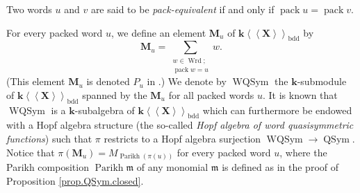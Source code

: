 \documentclass[numbers=enddot,12pt,final,onecolumn,notitlepage,abstracton]{scrartcl}%
\theoremstyle{definition}
\newenvironment{noncompile}{}{}
\let\sumnonlimits\sum
\renewcommand{\sum}{\sumnonlimits\limits}
\begin{document}
\begin{noncompile}
Two words $u$ and $v$ are said to be \textit{pack-equivalent} if and only if
$\operatorname*{pack}u=\operatorname*{pack}v$.
\end{noncompile}

For every packed word $u$, we define an element $\mathbf{M}_{u}$ of
$\mathbf{k}\left\langle \left\langle \mathbf{X}\right\rangle \right\rangle
_{\operatorname*{bdd}}$ by%
\[
\mathbf{M}_{u}=\sum_{\substack{w\in\operatorname*{Wrd};\\\operatorname*{pack}%
w=u}}w.
\]
(This element $\mathbf{M}_{u}$ is denoted $P_{u}$ in \cite[Section 5.1]%
{AFNT}.) We denote by $\operatorname*{WQSym}$ the $\mathbf{k}$-submodule of
$\mathbf{k}\left\langle \left\langle \mathbf{X}\right\rangle \right\rangle
_{\operatorname*{bdd}}$ spanned by the $\mathbf{M}_{u}$ for all packed words
$u$. It is known that $\operatorname*{WQSym}$ is a $\mathbf{k}$-subalgebra of
$\mathbf{k}\left\langle \left\langle \mathbf{X}\right\rangle \right\rangle
_{\operatorname*{bdd}}$ which can furthermore be endowed with a Hopf algebra
structure (the so-called \textit{Hopf algebra of word quasisymmetric
functions}) such that $\pi$ restricts to a Hopf algebra surjection
$\operatorname*{WQSym}\rightarrow\operatorname*{QSym}$. Notice that
$\pi\left(  \mathbf{M}_{u}\right)  =M_{\operatorname*{Parikh}\left(
\pi\left(  u\right)  \right)  }$ for every packed word $u$, where the Parikh
composition $\operatorname*{Parikh}\mathfrak{m}$ of any monomial
$\mathfrak{m}$ is defined as in the proof of Proposition
\ref{prop.QSym.closed}.
\end{document}

